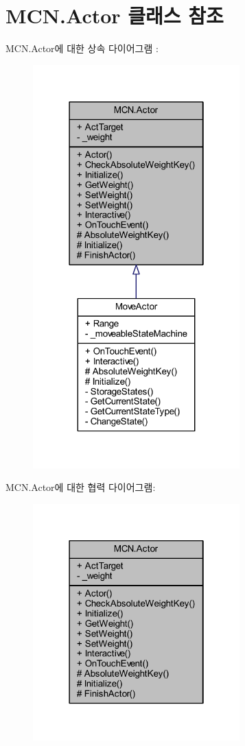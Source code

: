 \hypertarget{class_m_c_n_1_1_actor}{}\section{M\+C\+N.\+Actor 클래스 참조}
\label{class_m_c_n_1_1_actor}


M\+C\+N.\+Actor에 대한 상속 다이어그램 \+: \nopagebreak
\begin{figure}[H]
\begin{center}
\leavevmode
\includegraphics[width=226pt]{class_m_c_n_1_1_actor__inherit__graph}
\end{center}
\end{figure}


M\+C\+N.\+Actor에 대한 협력 다이어그램\+:\nopagebreak
\begin{figure}[H]
\begin{center}
\leavevmode
\includegraphics[width=226pt]{class_m_c_n_1_1_actor__coll__graph}
\end{center}
\end{figure}
